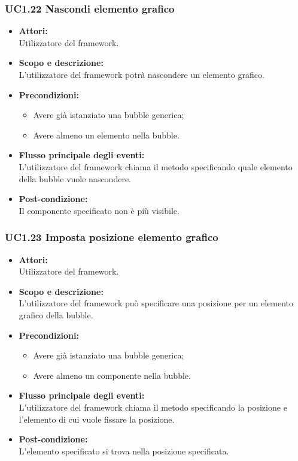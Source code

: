 \subsubsection{UC1.22 Nascondi elemento grafico} \label{UC1.22}

\begin{itemize}
	\item \textbf{Attori:}
	\\Utilizzatore del framework.
	\item \textbf{Scopo e descrizione:} 
	\\L’utilizzatore del framework potrà nascondere un elemento grafico.
	\item \textbf{Precondizioni:}
	\begin{itemize}
		\item Avere già istanziato una bubble generica;
		\item Avere almeno un elemento nella bubble.
	\end{itemize}
	\item \textbf{Flusso principale degli eventi:}
	\\L’utilizzatore del framework chiama il metodo specificando quale elemento della bubble vuole nascondere.
	\item \textbf{Post-condizione:}
	\\Il componente specificato non è più visibile.
\end{itemize}

\subsubsection{UC1.23 Imposta posizione elemento grafico} \label{UC1.23}

\begin{itemize}
	\item \textbf{Attori:}
	\\Utilizzatore del framework.
	\item \textbf{Scopo e descrizione:} 
	\\L’utilizzatore del framework può specificare una posizione per un elemento grafico della bubble.
	\item \textbf{Precondizioni:}
	\begin{itemize}
		\item Avere già istanziato una bubble generica;
		\item Avere almeno un componente nella bubble.
	\end{itemize}
	\item \textbf{Flusso principale degli eventi:}
	\\L’utilizzatore del framework chiama il metodo specificando la posizione e l’elemento di cui vuole fissare la posizione.
	\item \textbf{Post-condizione:}
	\\L’elemento specificato si trova nella posizione specificata.
\end{itemize}

